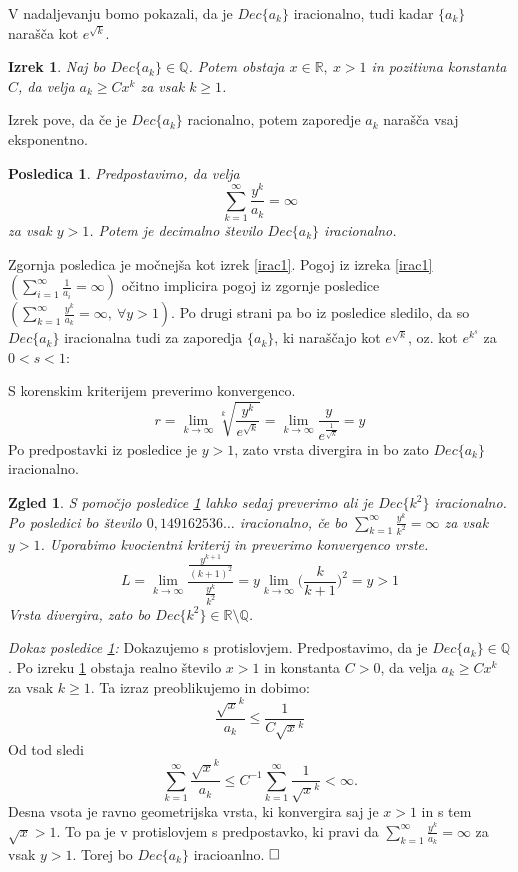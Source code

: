 \documentclass[a4paper,12pt]{article}
\def\Q{\mathbb{Q}} %
\def\R{\mathbb{R}} %
\def\qed{$\hfill\Box$}   %
\newtheorem{izrek}{Izrek}
\newtheorem{posledica}{Posledica}
\newtheorem{zgled}{Zgled}
\begin{document}
V nadaljevanju bomo pokazali, da je $Dec\{a_k\}$ iracionalno, tudi kadar $\{a_k\}$ narašča kot $e^{\sqrt{k}}$.

\begin{izrek}
    \label{izrek1clanek2}
    Naj bo $Dec\{a_k\} \in \Q$. Potem obstaja $x \in \R, \ x > 1$ in pozitivna konstanta $C$,
    da velja $a_k \geq Cx^k$ za vsak $k \geq 1$.
\end{izrek}

Izrek pove, da če je $Dec\{a_k\}$ racionalno, potem zaporedje $a_k$ narašča vsaj eksponentno.

\begin{posledica}
    \label{posledica}
    Predpostavimo, da velja
    \[
        \sum_{k=1}^{\infty}\frac{y^k}{a_k} = \infty\]
    za vsak $y > 1$. Potem je decimalno število $Dec\{a_k\}$ iracionalno.
\end{posledica}

Zgornja posledica je močnejša kot izrek \ref{irac1}. Pogoj iz izreka \ref{irac1} 
$(\sum_{i=1}^{\infty} \frac{1}{a_i} = \infty)$ očitno implicira
pogoj iz zgornje posledice $(\sum_{k=1}^{\infty}\frac{y^k}{a_k} = \infty , \ \forall y > 1)$.
Po drugi strani pa bo iz posledice sledilo, da so $Dec\{a_k\}$ iracionalna tudi za zaporedja
$\{a_k\}$, ki naraščajo kot $e^{\sqrt{k}}$, oz. kot $e^{k^s}$ za $0 < s < 1$:

S korenskim kriterijem preverimo konvergenco.
\[
    r = \lim_{k \rightarrow \infty}\sqrt[k]{\frac{y^k}{e^{\sqrt{k}}}} = \lim_{k \rightarrow \infty}\frac{y}{e^{\frac{1}{\sqrt{k}}}}
    = y
\]
Po predpostavki iz posledice je $y > 1$, zato vrsta divergira in bo zato $Dec\{a_k\}$ iracionalno.
\\

\begin{zgled}
    S pomočjo posledice \ref{posledica} lahko sedaj preverimo ali je $Dec\{k^2\}$ iracionalno.
    Po posledici bo število $0,149162536\dots$ iracionalno, če bo $\sum_{k=1}^{\infty}\frac{y^k}{k^2} = \infty$
    za vsak $y > 1$. Uporabimo kvocientni kriterij in preverimo konvergenco vrste.
    \[
        L = \lim_{k \rightarrow \infty} \frac{\frac{y^{k+1}}{(k+1)^2}}{\frac{y^k}{k^2}}
        = y \lim_{k \rightarrow \infty} \big (\frac{k}{k + 1}\big)^2 = y > 1
    \]
    Vrsta divergira, zato bo $Dec\{k^2\} \in \R \setminus \Q$.
\end{zgled}

\noindent
{\em Dokaz posledice \ref{posledica}:\/}
Dokazujemo s protislovjem. Predpostavimo, da je $Dec\{a_k\} \in \Q$.
Po izreku \ref{izrek1clanek2} obstaja realno število $x > 1$ in konstanta $C>0$, da velja
$a_k \geq Cx^k$ za vsak $k \geq 1$. Ta izraz preoblikujemo in dobimo:
\[
    \frac{\sqrt{x}^k}{a_k} \leq \frac{1}{C\sqrt{x}^k}\] 
Od tod sledi
\[ \sum_{k=1}^{\infty} \frac{\sqrt{x}^k}{a_k} \leq C^{-1} \sum_{k=1}^{\infty} \frac{1}{\sqrt{x}^k} < \infty.\]
Desna vsota je ravno geometrijska vrsta, ki konvergira saj je $x > 1$ in s tem $\sqrt{x} > 1$.
To pa je v protislovjem s predpostavko, ki pravi da $\sum_{k=1}^{\infty}\frac{y^k}{a_k} = \infty$ za vsak $y>1$.
Torej bo $Dec\{a_k\}$ iracioanlno.
\qed
\end{document}
